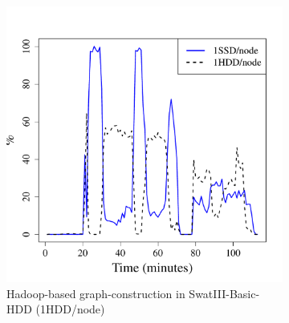 \documentclass[conference]{IEEEtran}
\begin{document}
\begin{figure}[htb]
        \begin{subfigure}[b]{0.23\textwidth}
                \includegraphics[width=\textwidth]{Figure/SystemData/Plots/BGCPUHDD.pdf}
                \caption{Hadoop-based graph-construction in SwatIII-Basic-HDD (1HDD/node)}
                \label{fig:BGCPUHDD}
        \end{subfigure}
		\begin{subfigure}[b]{0.23\textwidth}

\end{subfigure}
\end{figure}
\end{document}
